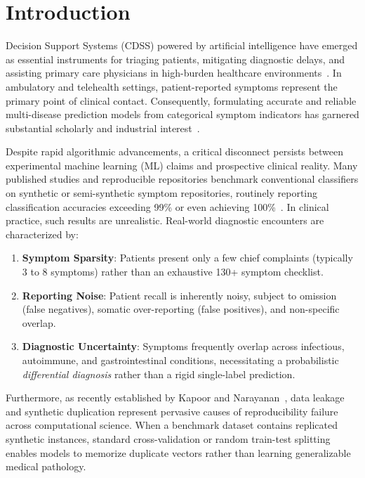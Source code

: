 \section{Introduction}
\label{sec:introduction}

 Decision Support Systems (CDSS) powered by artificial intelligence have emerged as essential instruments for triaging patients, mitigating diagnostic delays, and assisting primary care physicians in high-burden healthcare environments~\cite{shortliffe2018clinical, topol2019high}. In ambulatory and telehealth settings, patient-reported symptoms represent the primary point of clinical contact. Consequently, formulating accurate and reliable multi-disease prediction models from categorical symptom indicators has garnered substantial scholarly and industrial interest~\cite{chen2016xgboost, breiman2001random}.

Despite rapid algorithmic advancements, a critical disconnect persists between experimental machine learning (ML) claims and prospective clinical reality. Many published studies and reproducible repositories benchmark conventional classifiers on synthetic or semi-synthetic symptom repositories, routinely reporting classification accuracies exceeding 99\% or even achieving 100\%~\cite{kaushil2020kaggle}. In clinical practice, such results are unrealistic. Real-world diagnostic encounters are characterized by:
\begin{enumerate}
    \item \textbf{Symptom Sparsity}: Patients present only a few chief complaints (typically 3 to 8 symptoms) rather than an exhaustive 130+ symptom checklist.
    \item \textbf{Reporting Noise}: Patient recall is inherently noisy, subject to omission (false negatives), somatic over-reporting (false positives), and non-specific overlap.
    \item \textbf{Diagnostic Uncertainty}: Symptoms frequently overlap across infectious, autoimmune, and gastrointestinal conditions, necessitating a probabilistic \emph{differential diagnosis} rather than a rigid single-label prediction.
\end{enumerate}

Furthermore, as recently established by Kapoor and Narayanan~\cite{kapoor2023leakage}, data leakage and synthetic duplication represent pervasive causes of reproducibility failure across computational science. When a benchmark dataset contains replicated synthetic instances, standard cross-validation or random train-test splitting enables models to memorize duplicate vectors rather than learning generalizable medical pathology.

